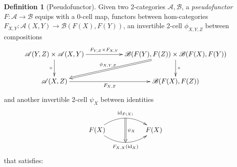 \documentclass[openany, amssymb, psamsfonts]{amsart}
\theoremstyle{definition}
\newtheorem{defn}{Definition}[section]
\numberwithin{equation}{section}
\newcommand{\A}{\mathscr{A}}
\newcommand{\B}{\mathscr{B}}
\newcommand{\id}{\mathrm{id}} %
\begin{document}
\begin{defn}[Pseudofunctor]\label{defn_pseudofunctor}
    Given two 2-categories $\A,\B$, a \emph{pseudofunctor} $F:\A\rightarrow \B$ equips with a 0-cell map, functors between hom-categories $F_{X,Y}:\A(X,Y)\rightarrow \B(F(X),F(Y))$, an invertible 2-cell $\phi_{X,Y,Z}$ between compositions
    \begin{align*}
        \xymatrix{
            \A(Y,Z)\times \A(X,Y) \ar[d]_-{\circ} \ar[rr]^-{F_{Y,Z}\times F_{X,Y}} && \B(F(Y),F(Z))\times\B(F(X),F(Y)) \ar[d]^-{\circ} \ar@{=>}[dll]_-{\phi_{X,Y,Z}}\\
            \A(X,Z) \ar[rr]_-{F_{X,Z}} && \B(F(X),F(Z))
        }
    \end{align*}
    and another invertible 2-cell $\psi_X$ between identities
    \begin{align*}
        \xymatrix{
            F(X) \ar@/^1.5pc/[rr]^{\id_{F(X)}}="1" \ar@/_1.5pc/[rr]_{F_{X,X}(\id_X)}="2"
            \ar@{=>} "1";"2"^{\psi_X}
            && F(X)
        }
    \end{align*}
    that satisfies:


\end{defn}
\end{document}
